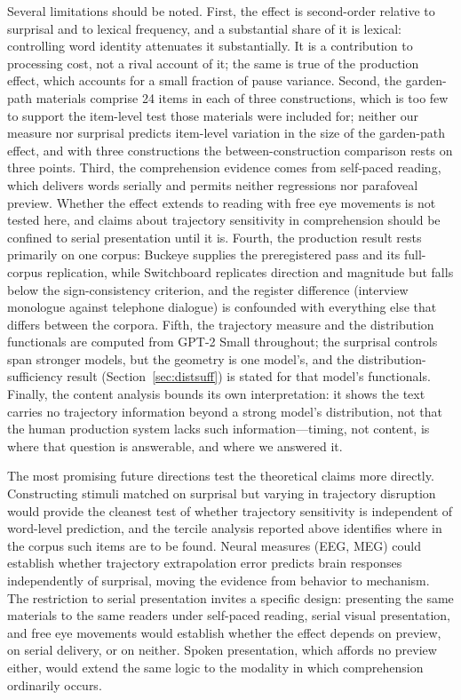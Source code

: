 \documentclass[12pt]{article}
\newcommand{\new}[1]{#1}   %
\begin{document}
\new{Several limitations should be noted. First, the effect is second-order relative to surprisal and to lexical frequency, and a substantial share of it is lexical: controlling word identity attenuates it substantially. It is a contribution to processing cost, not a rival account of it; the same is true of the production effect, which accounts for a small fraction of pause variance. Second, the garden-path materials comprise 24 items in each of three constructions, which is too few to support the item-level test those materials were included for; neither our measure nor surprisal predicts item-level variation in the size of the garden-path effect, and with three constructions the between-construction comparison rests on three points. Third, the comprehension evidence comes from self-paced reading, which delivers words serially and permits neither regressions nor parafoveal preview. Whether the effect extends to reading with free eye movements is not tested here, and claims about trajectory sensitivity in comprehension should be confined to serial presentation until it is. Fourth, the production result rests primarily on one corpus: Buckeye supplies the preregistered pass and its full-corpus replication, while Switchboard replicates direction and magnitude but falls below the sign-consistency criterion, and the register difference (interview monologue against telephone dialogue) is confounded with everything else that differs between the corpora. Fifth, the trajectory measure and the distribution functionals are computed from GPT-2 Small throughout; the surprisal controls span stronger models, but the geometry is one model's, and the distribution-sufficiency result (Section~\ref{sec:distsuff}) is stated for that model's functionals. Finally, the content analysis bounds its own interpretation: it shows the text carries no trajectory information beyond a strong model's distribution, not that the human production system lacks such information---timing, not content, is where that question is answerable, and where we answered it.}

The most promising future directions test the theoretical claims more directly. Constructing stimuli matched on surprisal but varying in trajectory disruption would provide the cleanest test of whether trajectory sensitivity is independent of word-level prediction\new{, and the tercile analysis reported above identifies where in the corpus such items are to be found}. Neural measures (EEG, MEG) could establish whether trajectory extrapolation error predicts brain responses independently of surprisal, moving the evidence from behavior to mechanism. \new{The restriction to serial presentation invites a specific design: presenting the same materials to the same readers under self-paced reading, serial visual presentation, and free eye movements would establish whether the effect depends on preview, on serial delivery, or on neither. Spoken presentation, which affords no preview either, would extend the same logic to the modality in which comprehension ordinarily occurs.}
\end{document}
